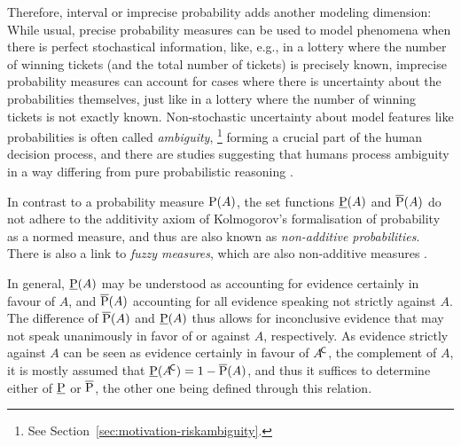 Therefore, interval or imprecise probability adds another modeling dimension:
While usual, precise probability measures can be used to model phenomena when there is perfect stochastical information,
like, e.g., in a lottery where the number of winning tickets (and the total number of tickets) is precisely known,
imprecise probability measures can account for cases where there is uncertainty about the probabilities themselves,
just like in a lottery where the number of winning tickets is not exactly known.
Non-stochastic uncertainty about model features like probabilities is often called \emph{ambiguity},%
\footnote{See Section~\ref{sec:motivation-riskambiguity}.}
forming a crucial part of the human decision process,
and there are studies suggesting that humans process ambiguity in a way
differing from pure probabilistic reasoning \parencite{2005:hsu-bhatt}.

In contrast to a probability measure $\operatorname{P}(A)$,
the set functions $\underline{\operatorname{P}}(A)$ and $\overline{\operatorname{P}}(A)$ do not adhere
to the additivity axiom of Kolmogorov's \parencite*{1933:kolmogorov}
formalisation of probability as a normed measure,
and thus are also known as \emph{non-additive probabilities}.
There is also a link to \emph{fuzzy measures}, which are also non-additive measures
\parencite[see, e.g.,][]{1997:denneberg}.

In general, $\underline{\operatorname{P}}(A)$ may be understood as accounting for evidence certainly in favour of $A$,
and $\overline{\operatorname{P}}(A)$ accounting for all evidence speaking not strictly against $A$.
The difference of $\overline{\operatorname{P}}(A)$ and $\underline{\operatorname{P}}(A)$ thus allows for inconclusive evidence
that may not speak unanimously in favor of or against $A$, respectively.
As evidence strictly against $A$ can be seen as evidence certainly in favour of $A^{{\mbox{\!\scriptsize\textsf{C}}}}$,
the complement of $A$,
it is mostly assumed that $\underline{\operatorname{P}}(A^{{\mbox{\!\scriptsize\textsf{C}}}}) = 1 - \overline{\operatorname{P}}(A)$,
and thus it suffices to determine either of $\underline{\operatorname{P}}$ or $\overline{\operatorname{P}}$,
the other one being defined through this relation.

